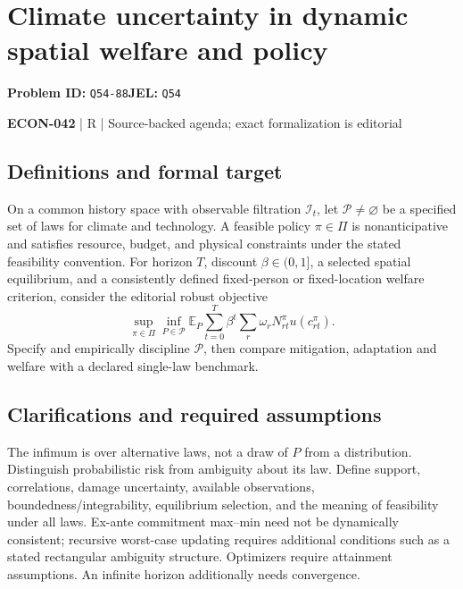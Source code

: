 \documentclass[11pt,a4paper]{article}
\begin{document}
\section*{Climate uncertainty in dynamic spatial welfare and policy}
\textbf{Problem ID:} \texttt{Q54-88}\quad \textbf{JEL:} \texttt{Q54}\par
\label{problem:OP-0615}


\label{audited:ECON-042}

{\sffamily\small\color{muted}\textbf{ECON-042} | R | Source-backed agenda; exact formalization is editorial\par}

\subsection*{Definitions and formal target}

On a common history space with observable filtration \(\mathcal I_t\), let \(\mathcal P\ne\varnothing\) be a specified set of laws for climate and technology. A feasible policy \(\pi\in\Pi\) is nonanticipative and satisfies resource, budget, and physical constraints under the stated feasibility convention. For horizon \(T\), discount \(\beta\in(0,1]\), a selected spatial equilibrium, and a consistently defined fixed-person or fixed-location welfare criterion, consider the editorial robust objective
\[
 \sup_{\pi\in\Pi}\inf_{P\in\mathcal P}
 \mathbb E_P\sum_{t=0}^{T}\beta^t
                \sum_r\omega_rN_{rt}^{\pi}u(c_{rt}^{\pi}).
\]
Specify and empirically discipline \(\mathcal P\), then compare mitigation, adaptation and welfare with a declared single-law benchmark.

\subsection*{Clarifications and required assumptions}

The infimum is over alternative laws, not a draw of \(P\) from a distribution. Distinguish probabilistic risk from ambiguity about its law. Define support, correlations, damage uncertainty, available observations, boundedness/integrability, equilibrium selection, and the meaning of feasibility under all laws. Ex-ante commitment max--min need not be dynamically consistent; recursive worst-case updating requires additional conditions such as a stated rectangular ambiguity structure. Optimizers require attainment assumptions. An infinite horizon additionally needs convergence.
\end{document}
